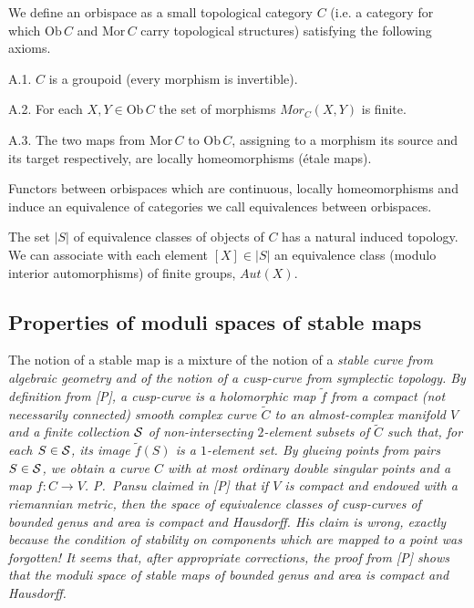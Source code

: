 \documentclass{amsart}
\begin{document}
We define an orbispace as a small topological category $C$ (i.e. a category for
which $\text{Ob}\,C$ and $\text{Mor}\,C$ carry topological structures)
satisfying the following axioms.

A.1. $C$ is a groupoid (every morphism is invertible).

A.2. For each $X,Y\in \text{Ob}\,C$ the set of morphisms
  $Mor_C(X,Y)$ is finite.

A.3. The two maps from $\text{Mor}\,C$ to $\text{Ob}\,C$, assigning to a
morphism its source and its target respectively,
 are locally homeomorphisms (\'etale maps).


Functors between orbispaces which are continuous, locally homeomorphisms and
induce an equivalence of categories we call equivalences between orbispaces.


The set $|S|$ of equivalence classes of objects of $C$ has a natural induced
topology. We can associate with each element $[X]\in |S|$ an equivalence class
(modulo interior automorphisms) of finite groups, $Aut(X)$.


\subsection{Properties of moduli spaces of stable maps}

The notion of a stable map is a mixture of the notion of a \it stable curve \rm
from algebraic geometry and of the notion of a  \it cusp-curve \rm
 from symplectic topology.
  By definition from [P], a cusp-curve is a holomorphic map $\widetilde f$ from
a compact (not necessarily connected) smooth complex curve $\widetilde C$ to an
almost-complex manifold $V$ and a finite collection $\mathcal S$ of
non-intersecting $2$-element subsets of $\widetilde C$ such that, for each
$S\in \mathcal S$,
 its image $\widetilde f(S)$ is a $1$-element set.
 By glueing points from pairs $S\in \mathcal S$, we obtain a curve $C$ with at most
ordinary double singular points and a map $f:C\to V$. P.~Pansu claimed in [P]
that if $V$ is compact and endowed with a riemannian metric, then the space of
equivalence classes
 of cusp-curves of bounded genus and area is compact and Hausdorff.
  His claim is wrong, exactly because the condition of stability on components
which are mapped to a point was forgotten!
  It seems that, after appropriate corrections, the proof from [P] shows that
the moduli space of stable maps of bounded genus and area is compact and
Hausdorff.
\end{document}
